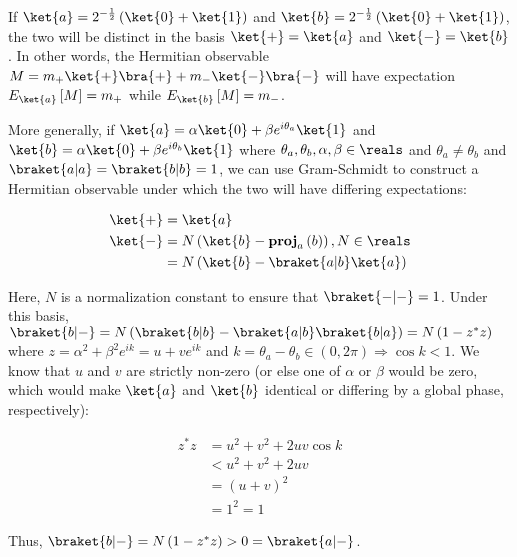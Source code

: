 \par If $\ket{a} = 2^{-\frac{1}{2}} \left( \ket{0} + \ket{1} \right)$ and
$\ket{b} = 2^{-\frac{1}{2}} \left( \ket{0} + \ket{1} \right)$, the two will be
distinct in the basis $\ket{+} = \ket{a}$ and $\ket{-} = \ket{b}$. In other
words, the Hermitian observable $M = m_{+} \ket{+} \bra{+} + m_{-} \ket{-}
\bra{-}$ will have expectation $E_{\ket{a}} \left[ M \right] = m_{+}$ while
$E_{\ket{b}} \left[ M \right] = m_{-}$.

\par More generally, if $\ket{a} = \alpha \ket{0} + \beta e^{i \theta_a}
\ket{1}$ and $\ket{b} = \alpha \ket{0} + \beta e^{i \theta_b} \ket{1}$ where
$\theta_a, \theta_b, \alpha, \beta \in \reals$ and $\theta_a \ne \theta_b$ and
$\braket{a|a} = \braket{b|b} = 1$, we can use Gram-Schmidt to construct a
Hermitian observable under which the two will have differing expectations:

\begin{align}
\ket{+} &= \ket{a} \\
\ket{-} &= N \left( \ket{b} - \mathbf{proj}_a \left( b \right) \right), N \in
\reals \\
&= N \left( \ket{b} - \braket{a|b} \ket{a} \right)
\end{align}

Here, $N$ is a normalization constant to ensure that $\braket{-|-} = 1$. Under
this basis, $\braket{b|-} = N \left( \braket{b|b} - \braket{a|b} \braket{b|a}
\right) = N \left( 1 - z^* z \right)$ where $z = \alpha^2 + \beta^2 e^{i k} = u
+ v e^{i k}$ and $k = \theta_a - \theta_b \in \left( 0, 2 \pi \right)
\Rightarrow \cos k < 1$. We know that $u$ and $v$ are strictly non-zero (or else
one of $\alpha$ or $\beta$ would be zero, which would make $\ket{a}$ and
$\ket{b}$ identical or differing by a global phase, respectively):

\begin{align}
z^* z &= u^2 + v^2 + 2 u v \cos k \\
&< u^2 + v^2 + 2 u v \\
&= \left( u + v \right)^2 \\
&= 1^2 = 1
\end{align}

Thus, $\braket{b|-} = N \left( 1 - z^* z \right) > 0 = \braket{a|-}$.
